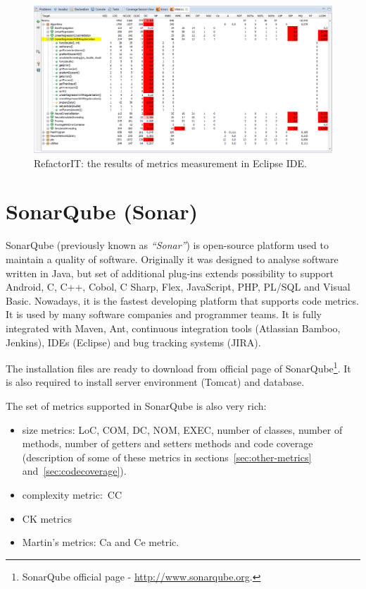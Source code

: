 \begin{figure}[h!]
	\centering
	\includegraphics[scale=0.45]{img/refactorit2.png}  
	\caption{RefactorIT: the results of metrics measurement in Eclipse IDE.}		
	\label{fig:refactor2}
\end{figure}

\section{SonarQube (Sonar)}
SonarQube (previously known as \textit{``Sonar''}) is open-source platform used to maintain a quality of software. Originally it was designed to analyse software written in Java, but set of additional plug-ins extends possibility to support Android, C, C++, Cobol, C Sharp, Flex, JavaScript, PHP, PL/SQL and Visual Basic. Nowadays, it is the fastest developing platform that supports code metrics. It is used by many software companies and programmer teams. It is fully integrated with Maven, Ant, continuous integration tools (Atlassian Bamboo, Jenkins), IDEs (Eclipse) and bug tracking systems (JIRA).    

The installation files are ready to download from official page of SonarQube\footnote{SonarQube official page - \url{http://www.sonarqube.org}.}. It is also required to install server environment (Tomcat) and database. 

The set of metrics supported in SonarQube is also very rich:

\begin{itemize}
\item size metrics:  \ac{LoC}, \ac{COM}, \ac{DC}, \ac{NOM}, \ac{EXEC}, number of classes,  number of methods, number of getters and setters methods and code coverage (description of some of these metrics in sections~\ref{sec:other-metrics} and~\ref{sec:codecoverage}).
\item complexity metric:~\ac{CC}
\item \ac{CK metrics}
\item Martin's metrics: \ac{Ca} and \ac{Ce} metric.
\end{itemize}

